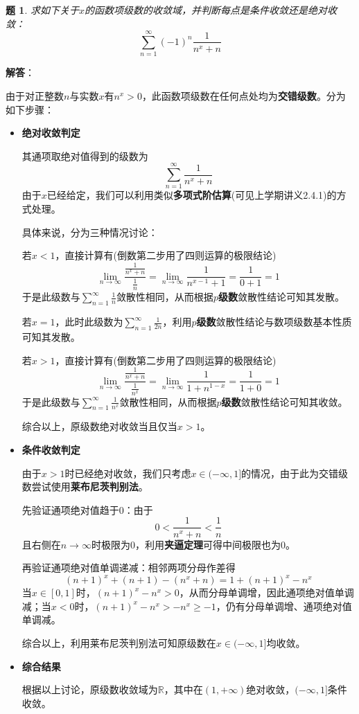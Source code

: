 \documentclass[a4paper,UTF8,fontset=windows,AutoFakeBold]{ctexart}
\newcommand*{\rb}{\mathbb{R}}
\newcommand*{\suminf}[1][n=1]{\sum_{#1}^\infty}
\theoremstyle{ex}
\newtheorem{exercise}{题}
\newcommand{\sol}[1]{{\vspace{5pt}\kaishu\noindent\textbf{解答}：\vspace{-3pt}
\begin{compactitem}
    \item[] #1
\end{compactitem}
}}
\begin{document}
\begin{framed}
\begin{exercise}
    求如下关于$x$的函数项级数的收敛域，并判断每点是条件收敛还是绝对收敛：
    $$\suminf(-1)^n\frac{1}{n^x+n}$$
\end{exercise}
\sol{
    由于对正整数$n$与实数$x$有$n^x>0$，此函数项级数在任何点处均为\textbf{交错级数}。分为如下步骤：
    \begin{itemize}
        \item \textbf{绝对收敛判定}
        
        其通项取绝对值得到的级数为
        $$\suminf\frac{1}{n^x+n}$$
        由于$x$已经给定，我们可以利用类似\textbf{多项式阶估算}(可见上学期讲义2.4.1)的方式处理。

        具体来说，分为三种情况讨论：
        
        若$x<1$，直接计算有(倒数第二步用了四则运算的极限结论)
        $$\lim_{n\to\infty}\frac{\frac{1}{n^x+n}}{\frac{1}{n}}=\lim_{n\to\infty}\frac{1}{n^{x-1}+1}=\frac{1}{0+1}=1$$
        于是此级数与$\suminf\frac{1}{n}$敛散性相同，从而根据\textbf{$p$级数}敛散性结论可知其发散。

        若$x=1$，此时此级数为$\suminf\frac{1}{2n}$，利用\textbf{$p$级数}敛散性结论与数项级数基本性质可知其发散。

        若$x>1$，直接计算有(倒数第二步用了四则运算的极限结论)
        $$\lim_{n\to\infty}\frac{\frac{1}{n^x+n}}{\frac{1}{n^x}}=\lim_{n\to\infty}\frac{1}{1+n^{1-x}}=\frac{1}{1+0}=1$$
        于是此级数与$\suminf\frac{1}{n^x}$敛散性相同，从而根据\textbf{$p$级数}敛散性结论可知其收敛。

        综合以上，原级数绝对收敛当且仅当$x>1$。

        \item \textbf{条件收敛判定}
        
        由于$x>1$时已经绝对收敛，我们只考虑$x\in(-\infty,1]$的情况，由于此为交错级数尝试使用\textbf{莱布尼茨判别法}。

        先验证通项绝对值趋于0：由于
        $$0<\frac{1}{n^x+n}<\frac{1}{n}$$
        且右侧在$n\to\infty$时极限为0，利用\textbf{夹逼定理}可得中间极限也为0。

        再验证通项绝对值单调递减：相邻两项分母作差得
        $$(n+1)^x+(n+1)-(n^x+n)=1+(n+1)^x-n^x$$
        当$x\in[0,1]$时，$(n+1)^x-n^x>0$，从而分母单调增，因此通项绝对值单调减；当$x<0$时，$(n+1)^x-n^x>-n^x\ge-1$，仍有分母单调增、通项绝对值单调减。

        综合以上，利用莱布尼茨判别法可知原级数在$x\in(-\infty,1]$均收敛。
        
        \item \textbf{综合结果}
        
        根据以上讨论，原级数收敛域为$\rb$，其中在$(1,+\infty)$绝对收敛，$(-\infty,1]$条件收敛。
    \end{itemize}
}
\end{framed}
\end{document}
